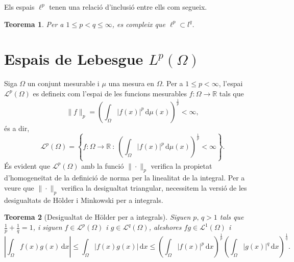 \documentclass[12pt]{book}
\newtheorem{teorema}{Teorema}[chapter]
\theoremstyle{definition}
\theoremstyle{nota}
\theoremstyle{exemple}
\begin{document}
Els espais $\ell^p$ tenen una relació d'inclusió entre ells com
segueix.

\begin{teorema}
  Per a $1 \leq p < q \leq \infty$, es compleix que
  $\ell^p \subset l^q$.
\end{teorema}

\section{Espais de Lebesgue \texorpdfstring{$L^p(\Omega)$}{Lp}}

Siga $\Omega$ un conjunt mesurable i $\mu$ una mesura en $\Omega$. Per
a $1 \leq p < \infty$, l'espai $\mathcal{L}^p(\Omega)$ es defineix com
l'espai de les funcions mesurables $f : \Omega \to \mathbb{R}$ tals
que
\[
  \|f\|_p = \left( \int_\Omega |f(x)|^p \, \mathrm{d}\mu(x)
  \right)^{\frac{1}{p}} < \infty,
\]
és a dir,
\[
  \mathcal{L}^p(\Omega) = \left\{ f : \Omega \to \mathbb{R}\ :\ \left(
      \int_\Omega |f(x)|^p \, \mathrm{d}\mu(x) \right)^{\frac{1}{p}} <
    \infty \right\}.
\]
És evident que $\mathcal{L}^p(\Omega)$ amb la funció $\|\cdot\|_p$
verifica la propietat d'homogeneïtat de la definició de norma per la
linealitat de la integral. Per a veure que $\|\cdot\|_p$ verifica la
desigualtat triangular, necessitem la versió de les desigualtats de
Hölder i Minkowski per a integrals.

\begin{teorema}[Desigualtat de Hölder per a integrals]
  Siguen $p,\,q>1$ tals que $\frac{1}{p} + \frac{1}{q} = 1$, i siguen
  $f \in \mathcal{L}^p(\Omega)$ i $g \in \mathcal{L}^q(\Omega)$,
  aleshores $fg \in \mathcal{L}^1(\Omega)$ i
  \[
    \left| \int_\Omega f(x)g(x)\, \mathrm{d}x \right| \leq
    \int_\Omega |f(x)g(x)|\,\mathrm{d}x \leq
    \left(\int_\Omega |f(x)|^p\,\mathrm{d}x\right)^{\frac{1}{p}}
    \left(\int_\Omega |g(x)|^q\,\mathrm{d}x\right)^{\frac{1}{q}}.
  \]
\end{teorema}
\end{document}
